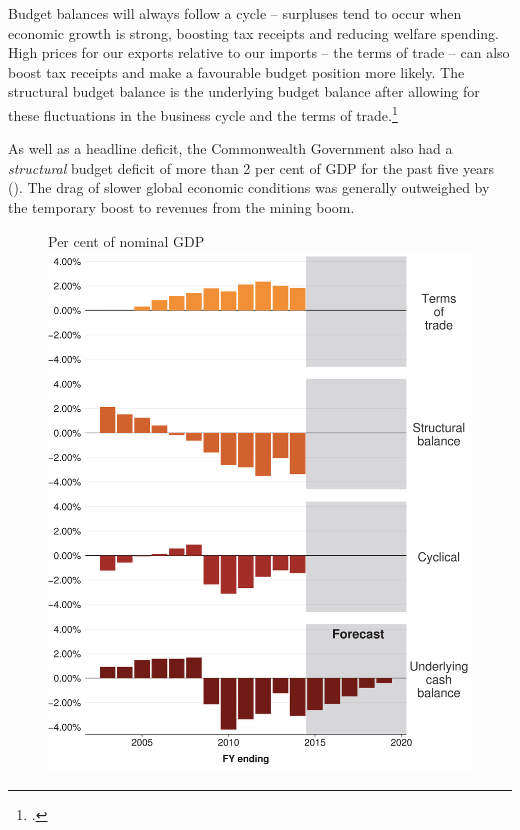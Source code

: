 \documentclass[twoside,english]{grattanBudgetRepairb5portrait}
\begin{document}
Budget balances will always follow a cycle – surpluses tend to occur when economic growth is strong, boosting tax receipts and reducing welfare spending. High prices for our exports relative to our imports – the terms of trade – can also boost tax receipts and make a favourable budget position more likely. The structural budget balance is the underlying budget balance after allowing for these fluctuations in the business cycle and the terms of trade.\footcite{DaleyWoodWeidmannEtAl2014}  

As well as a headline deficit, the Commonwealth Government also had a \emph{structural} budget deficit of more than 2 per cent of GDP for the past five years (). The drag of slower global economic conditions was generally outweighed by the temporary boost to revenues from the mining boom. 

\begin{figure}
%
{Per cent of nominal GDP}
\includegraphics[width=\columnwidth]{Fiscal-challenges/figure/b5-Figure1-1.pdf}

\vspace{0.075\textheight}
\end{figure}
\end{document}
